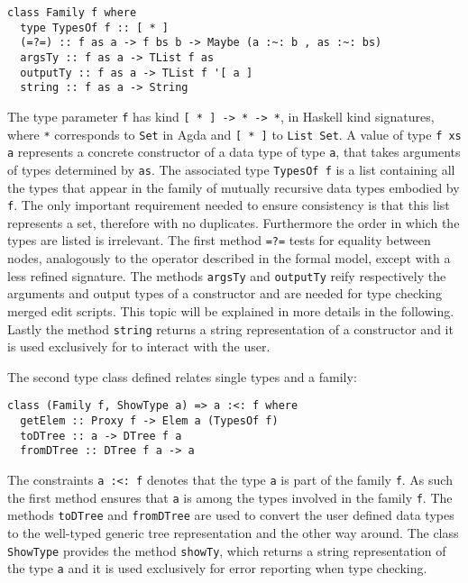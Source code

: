 \documentclass[../Thesis.tex]{subfiles}
\begin{document}
\begin{verbatim}
class Family f where
  type TypesOf f :: [ * ]
  (=?=) :: f as a -> f bs b -> Maybe (a :~: b , as :~: bs) 
  argsTy :: f as a -> TList f as
  outputTy :: f as a -> TList f '[ a ]
  string :: f as a -> String
\end{verbatim}

	The type parameter \texttt{f} has kind \texttt{[ * ] -> * -> *}, in
	Haskell kind signatures, where \texttt{*} corresponds to \texttt{Set} in
	Agda and \texttt{[ * ]} to \texttt{List Set}. 
	A value of type \texttt{f xs a} represents a concrete constructor
	of a data type of type \texttt{a}, that takes arguments of types determined 
	by \texttt{as}.
	The associated type \texttt{TypesOf f} is a list containing all the types
	that appear in the family of mutually recursive data types embodied by
	\texttt{f}. The only important requirement needed to ensure consistency
	is that this list represents a set, therefore with no duplicates. Furthermore
	the order in which the types are listed is irrelevant.
	The first method \texttt{=?=} tests for equality between nodes, analogously
	to the operator described in the formal model, except with a less 
	refined signature.
	The methods \texttt{argsTy} and \texttt{outputTy} reify respectively the
	arguments and output types of a constructor and are needed for
	type checking merged edit scripts. This topic
	will be explained in more details in the following.
	Lastly the method \texttt{string} returns a string representation of a
	constructor and it is used exclusively for to interact with the user.
	
	The second type class defined relates single types and a family:
\begin{verbatim}
class (Family f, ShowType a) => a :<: f where
  getElem :: Proxy f -> Elem a (TypesOf f)
  toDTree :: a -> DTree f a 
  fromDTree :: DTree f a -> a
\end{verbatim}
	
	The constraints \texttt{a :<: f} denotes that the type \texttt{a} is part
	of the family \texttt{f}.
	As such the first method ensures that \texttt{a} is among the types
	involved in the family \texttt{f}.
	The methods \texttt{toDTree} and \texttt{fromDTree} are used to convert
	the user defined data types to the well-typed generic tree representation
	and the other way around.
	The class \texttt{ShowType} provides the method \texttt{showTy}, which
	returns a string representation of the type \texttt{a} and it is
	used exclusively for error reporting when type checking. 
\end{document}
